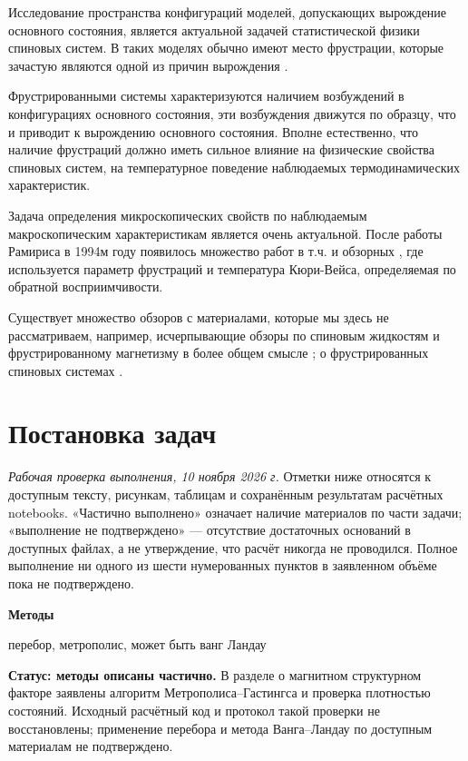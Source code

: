 \documentclass[utf8, babel, sor, jor, amsmath, amssymb, reprint]{elsarticle} %
\begin{document}
Исследование пространства конфигураций моделей, допускающих вырождение основного состояния, является актуальной задачей статистической физики спиновых систем. В таких моделях обычно имеют место фрустрации, которые зачастую являются одной из причин вырождения \cite{trukhin2025low, trukhin2024thermodynamic}. 


Фрустрированными системы характеризуются наличием возбуждений в конфигурациях основного состояния, эти возбуждения движутся по образцу, что и приводит к вырождению основного состояния. Вполне естественно, что наличие фрустраций должно иметь сильное влияние на физические свойства спиновых систем, на температурное поведение наблюдаемых термодинамических характеристик. 

Задача определения микроскопических свойств по наблюдаемым макроскопическим характеристикам является очень актуальной. После работы Рамириса \cite{ramirez1994strongly} в 1994м году появилось множество работ в т.ч. и обзорных \cite{mugiraneza2022tutorial, shaginyan2020theoretical}, где используется параметр фрустраций и температура Кюри-Вейса, определяемая по обратной восприимчивости. 

Существует множество обзоров с материалами, которые мы здесь не рассматриваем, например, исчерпывающие обзоры по спиновым жидкостям \cite{broholm2020quantum} и фрустрированному магнетизму в более общем смысле \cite{shaginyan2020theoretical}; о фрустрированных спиновых системах \cite{holdsworths2020steven}.


\section{Постановка задач}
\label{sec1}

\textit{Рабочая проверка выполнения, 10 ноября 2026 г.} Отметки ниже относятся к доступным тексту, рисункам, таблицам и сохранённым результатам расчётных notebooks. «Частично выполнено» означает наличие материалов по части задачи; «выполнение не подтверждено» --- отсутствие достаточных оснований в доступных файлах, а не утверждение, что расчёт никогда не проводился. Полное выполнение ни одного из шести нумерованных пунктов в заявленном объёме пока не подтверждено.

\textbf{Методы} 


перебор,  метрополис, может быть ванг Ландау 

\textbf{Статус: методы описаны частично.} В разделе о магнитном структурном факторе заявлены алгоритм Метрополиса--Гастингса и проверка плотностью состояний. Исходный расчётный код и протокол такой проверки не восстановлены; применение перебора и метода Ванга--Ландау по доступным материалам не подтверждено.
\end{document}

